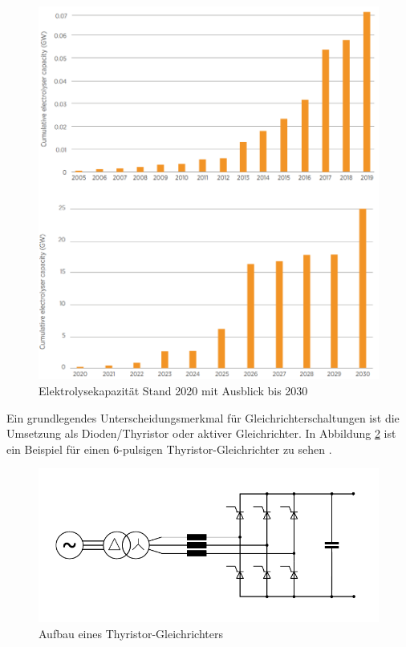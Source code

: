 	\begin{figure}
		\centering
		\includegraphics[width=0.7\linewidth]{content/Grafiken/Ely_Capacity}
		\caption[Elektrolyse Kapazität bis 2030]{Elektrolysekapazität Stand 2020 mit Ausblick bis 2030 \cite{IRENA2020}}
		\label{fig:elycapacity}
	\end{figure}
Ein grundlegendes Unterscheidungsmerkmal für Gleichrichterschaltungen ist die Umsetzung als Dioden/Thyristor oder aktiver Gleichrichter. In Abbildung \ref{fig:thyristor} ist ein Beispiel für einen 6-pulsigen Thyristor-Gleichrichter zu sehen . 
	\begin{figure} 
		\centering
		\includegraphics[width=0.9\linewidth]{content/Grafiken/Thyristor}
		\caption{Aufbau eines Thyristor-Gleichrichters}
		\label{fig:thyristor}
	\end{figure}
